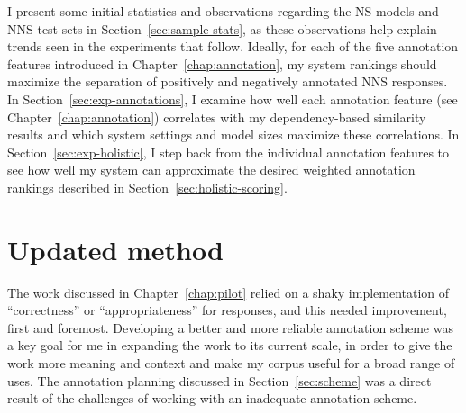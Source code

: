 
I present some initial statistics and observations regarding the NS models and NNS test sets in Section~\ref{sec:sample-stats}, as these observations help explain trends seen in the experiments that follow. 
Ideally, for each of the five annotation features introduced in Chapter~\ref{chap:annotation}, my system rankings should maximize the separation of positively and negatively annotated NNS responses.
In Section~\ref{sec:exp-annotations}, I examine how well each annotation feature (see Chapter~\ref{chap:annotation}) correlates with my dependency-based similarity results and which system settings and model sizes maximize these correlations. In Section~\ref{sec:exp-holistic}, I step back from the individual annotation features to see how well my system can approximate the desired weighted annotation rankings described in Section~\ref{sec:holistic-scoring}.


\section{Updated method}
\label{sec:current-method}
The work discussed in Chapter~\ref{chap:pilot} relied on a shaky implementation of ``correctness'' or ``appropriateness'' for responses, and this needed improvement, first and foremost. Developing a better and more reliable annotation scheme was a key goal for me in expanding the work to its current scale, in order to give the work more meaning and context and make my corpus useful for a broad range of uses. The annotation planning discussed in Section~\ref{sec:scheme} was a direct result of the challenges of working with an inadequate annotation scheme. 

